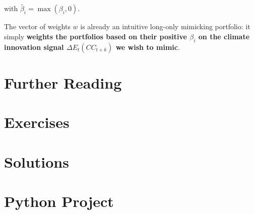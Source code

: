with $\tilde{\beta_i} = \max(\beta_i, 0)$.

The vector of weights $w$ is already an intuitive 
long-only mimicking portfolio: it simply 
\textbf{weights the portfolios based on their positive 
$\beta_i$ on the climate innovation signal 
$\Delta E_t(CC_{t+k})$ we wish to mimic}.
 

\section{Further Reading}

\section{Exercises}

\section{Solutions}

\section{Python Project}